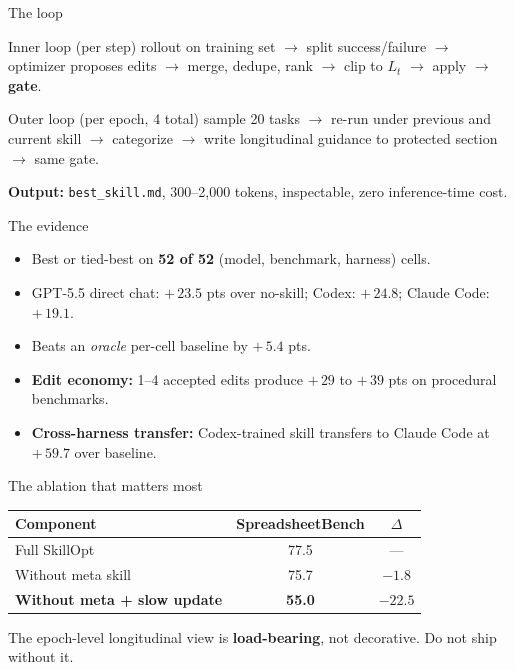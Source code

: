 \documentclass[aspectratio=169,11pt]{beamer}
\begin{document}
\begin{frame}{The loop}
  \begin{block}{Inner loop (per step)}
  \small
  rollout on training set $\to$ split success/failure $\to$ optimizer
  proposes edits $\to$ merge, dedupe, rank $\to$ clip to $L_t$ $\to$
  apply $\to$ \textbf{gate}.
  \end{block}

  \begin{block}{Outer loop (per epoch, 4 total)}
  \small
  sample 20 tasks $\to$ re-run under previous and current skill $\to$
  categorize $\to$ write longitudinal guidance to protected section
  $\to$ same gate.
  \end{block}

  \vspace{0.4em}
  \textbf{Output:} \texttt{best\_skill.md}, 300--2{,}000 tokens,
  inspectable, zero inference-time cost.
\end{frame}

\begin{frame}{The evidence}
  \begin{itemize}
    \item Best or tied-best on \textbf{52 of 52}
    (model, benchmark, harness) cells.
    \item GPT-5.5 direct chat: $+\,23.5$ pts over no-skill;
    Codex: $+\,24.8$; Claude Code: $+\,19.1$.
    \item Beats an \emph{oracle} per-cell baseline by $+\,5.4$ pts.
    \item \textbf{Edit economy:} 1--4 accepted edits produce $+\,29$ to
    $+\,39$ pts on procedural benchmarks.
    \item \textbf{Cross-harness transfer:} Codex-trained skill transfers
    to Claude Code at $+\,59.7$ over baseline.
  \end{itemize}
\end{frame}

\begin{frame}{The ablation that matters most}
  \begin{center}
  \begin{tabular}{@{}lcc@{}}
  \toprule
  Component & SpreadsheetBench & $\Delta$ \\
  \midrule
  Full SkillOpt & 77.5 & --- \\
  Without meta skill & 75.7 & $-1.8$ \\
  \textbf{Without meta + slow update} & \textbf{55.0} & $\mathbf{-22.5}$ \\
  \bottomrule
  \end{tabular}
  \end{center}

  \vspace{1em}
  The epoch-level longitudinal view is \textbf{load-bearing}, not
  decorative. Do not ship without it.
\end{frame}
\end{document}

